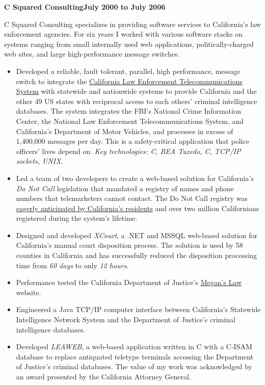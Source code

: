 \documentclass[a4paper,12pt]{article}
\newcommand{\jobheld}[2]{\textbf{#1\hfill #2}\nopagebreak}
\begin{document}
\jobheld{C Squared Consulting}{July 2000 to July 2006}

C Squared Consulting specializes in providing software services to California's law enforcement agencies.  For six years I worked with various software stacks on systems ranging from small internally used web applications, politically-charged web sites, and large high-performance message switches.

\begin{itemize}

\item Developed a reliable, fault tolerant, parallel, high performance, message switch to integrate the \href{http://definitions.uslegal.com/c/clets/}{California Law Enforcement Telecommunications System} with statewide and nationwide systems to provide California and the other 49 US states with reciprocal access to each others' criminal intelligence databases.  The system integrates the FBI's National Crime Information Center, the National Law Enforcement Telecommunications System, and California's Department of Motor Vehicles, and processes in excess of 1,400,000 messages per day.  This is a safety-critical application that police officers' lives depend on.  \emph{Key technologies: C, BEA Tuxedo, C, TCP/IP sockets, UNIX}.

\item Led a team of two developers to create a web-based solution for California's \emph{Do Not Call} legislation that mandated a registry of names and phone numbers that telemarketers cannot contact.  The Do Not Call registry was \href{http://www.sfgate.com/cgi-bin/article.cgi?f=/c/a/2003/03/31/MN5478.DTL}{eagerly anticipated by California's residents} and over two million Californians registered during the system's lifetime.

\item Designed and developed \emph{XCourt}, a .NET and MSSQL web-based solution for California's manual court disposition process. The solution is used by 58 counties in California and has successfully reduced the disposition processing time from \emph{60 days} to only \emph{12 hours}.

\item Performance tested the California Department of Justice's \href{http://www.meganslaw.ca.gov/}{Megan's Law} website.

\item Engineered a Java TCP/IP computer interface between California's Statewide Intelligence Network System and the Department of Justice's criminal intelligence databases.

\item Developed \emph{LEAWEB}, a web-based application written in C with a C-ISAM database to replace antiquated teletype terminals accessing the Department of Justice's criminal databases.  The value of my work was acknowledged by an award presented by the California Attorney General.

\end{itemize}
\end{document}
